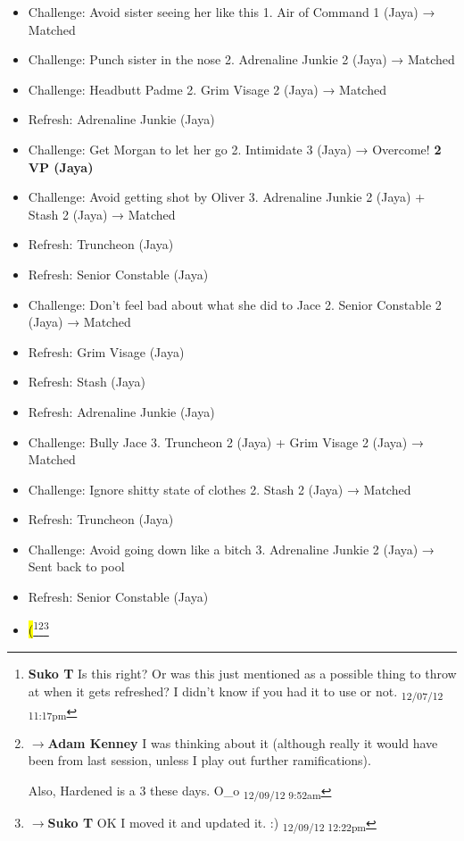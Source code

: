 {\begin{itemize}
\item Challenge: Avoid sister seeing her like this 1. Air of Command 1 (Jaya) → Matched
\item Challenge: Punch sister in the nose 2.  Adrenaline Junkie 2 (Jaya) → Matched
\item Challenge: Headbutt Padme 2. Grim Visage 2 (Jaya) → Matched
\item Refresh: Adrenaline Junkie (Jaya)
\item Challenge: Get Morgan to let her go 2.  Intimidate 3 (Jaya) → Overcome! \textbf{2 VP (Jaya)}
\item Challenge: Avoid getting shot by Oliver 3. Adrenaline Junkie 2 (Jaya) + Stash 2 (Jaya) → Matched
\item Refresh: Truncheon (Jaya)
\item Refresh: Senior Constable (Jaya)
\item Challenge: Don't feel bad about what she did to Jace 2.  Senior Constable 2 (Jaya) → Matched
\item Refresh: Grim Visage (Jaya)
\item Refresh: Stash (Jaya)
\item Refresh: Adrenaline Junkie (Jaya)
\item Challenge: Bully Jace 3.  Truncheon 2 (Jaya) + Grim Visage 2 (Jaya) → Matched
\item Challenge: Ignore shitty state of clothes 2.  Stash 2 (Jaya) → Matched
\item Refresh: Truncheon (Jaya)
\item Challenge: Avoid going down like a bitch 3. Adrenaline Junkie 2 (Jaya) → Sent back to pool
\item Refresh: Senior Constable (Jaya)
\end{itemize}

}


\begin{itemize}
\item \hl{(}\footnote{\textbf{Suko T }Is this right?  Or was this just mentioned as a possible thing to throw at when it gets refreshed?  I didn't know if you had it to use or not. \textsubscript{12/07/12 11:17pm}}\footnote{$\rightarrow$\textbf{Adam Kenney }I was thinking about it (although really it would have been from last session, unless I play out further ramifications).

Also, Hardened is a 3 these days. O\_o \textsubscript{12/09/12 9:52am}}\footnote{$\rightarrow$\textbf{Suko T }OK I moved it and updated it. :) \textsubscript{12/09/12 12:22pm}}
\end{itemize}



